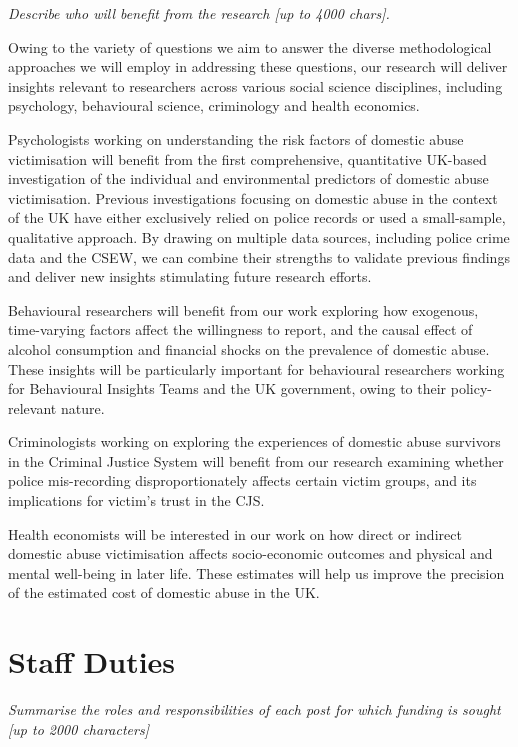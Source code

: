 \documentclass[11pt, a4paper]{article}
\begin{document}
\textit{Describe who will benefit from the research [up to 4000 chars].}

Owing to the variety of questions we aim to answer the diverse methodological approaches we will employ in addressing these questions, our research will deliver insights relevant to researchers across various social science disciplines, including psychology, behavioural science, criminology and health economics.

Psychologists working on understanding the risk factors of domestic abuse victimisation will benefit from the first comprehensive, quantitative UK-based investigation of the individual and environmental predictors of domestic abuse victimisation. Previous investigations focusing on domestic abuse in the context of the UK have either exclusively relied on police records or used a small-sample, qualitative approach. By drawing on multiple data sources, including police crime data and the CSEW, we can combine their strengths to validate previous findings and deliver new insights stimulating future research efforts.

Behavioural researchers will benefit from our work exploring how exogenous, time-varying factors affect the willingness to report, and the causal effect of alcohol consumption and financial shocks on the prevalence of domestic abuse. These insights will be particularly important for behavioural researchers working for Behavioural Insights Teams and the UK government, owing to their policy-relevant nature.

Criminologists working on exploring the experiences of domestic abuse survivors in the Criminal Justice System will benefit from our research examining whether police mis-recording disproportionately affects certain victim groups, and its implications for victim's trust in the CJS. 


Health economists will be interested in our work on how direct or indirect domestic abuse victimisation affects socio-economic outcomes and physical and mental well-being in later life. These estimates will help us improve the precision of the estimated cost of domestic abuse in the UK.


\section{Staff Duties}

\textit{Summarise the roles and responsibilities of each post for which funding is sought [up to 2000 characters]}
\end{document}
